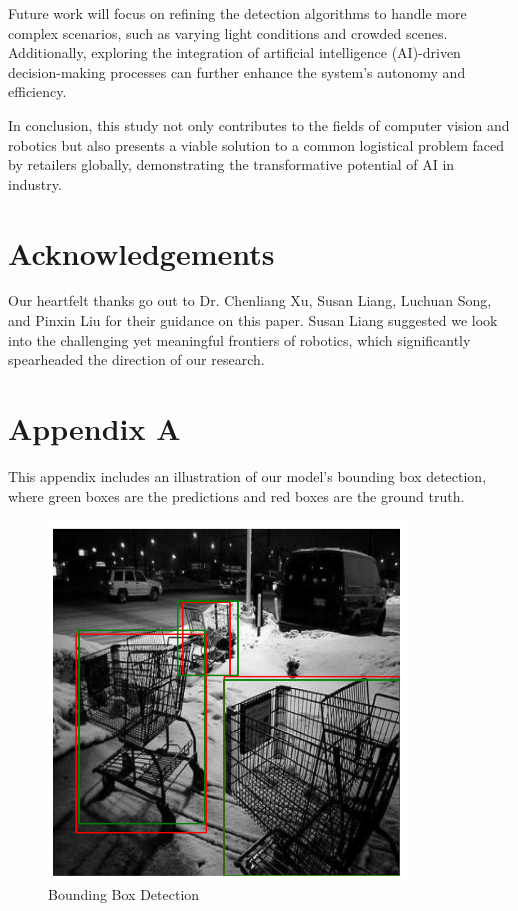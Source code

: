 \documentclass[10pt,twocolumn,letterpaper]{article}
\begin{document}
Future work will focus on refining the detection algorithms to handle more complex scenarios, such as varying light conditions and crowded scenes. Additionally, exploring the integration of artificial intelligence (AI)-driven decision-making processes can further enhance the system's autonomy and efficiency.

In conclusion, this study not only contributes to the fields of computer vision and robotics but also presents a viable solution to a common logistical problem faced by retailers globally, demonstrating the transformative potential of AI in industry.


\section*{Acknowledgements}
Our heartfelt thanks go out to Dr. Chenliang Xu, Susan Liang, Luchuan Song, and Pinxin Liu for their guidance on this paper. Susan Liang suggested we look into the challenging yet meaningful frontiers of robotics, which significantly spearheaded the direction of our research.

{\small

}

\appendix

\section{Appendix A}

This appendix includes an illustration of our model's bounding box detection, where green boxes are the predictions and red boxes are the ground truth.

\begin{figure}[H]
    \centering
    \includegraphics[width=0.8\linewidth]{images/bounding-box-detection.png}
    \caption{Bounding Box Detection}
    \label{fig:bb}
\end{figure}
\end{document}
